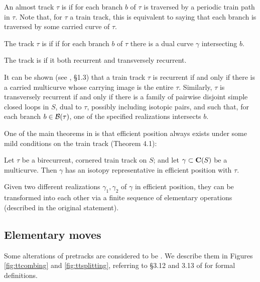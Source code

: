 \begin{defin}\label{def:recurrent}
An almost track $\tau$ is  if for each branch $b$ of $\tau$ is traversed by a periodic train path in $\tau$. Note that, for $\tau$ a train track, this is equivalent to saying that each branch is traversed by some carried curve of $\tau$.

The track $\tau$ is  if if for each branch $b$ of $\tau$ there is a dual curve $\gamma$ intersecting $b$.

The track is  if it both recurrent and transversely recurrent.
\end{defin}

It can be shown (see \cite{penner}, \S 1.3) that a train track $\tau$ is recurrent if and only if there is a carried multicurve whose carrying image is the entire $\tau$. Similarly, $\tau$ is transversely recurrent if and only if there is a family of pairwise disjoint simple closed loops in $S$, dual to $\tau$, possibly including isotopic pairs, and such that, for each branch $b\in\mathcal B(\tau)$, one of the specified realizations intersects $b$.

One of the main theorems in \cite{mms} is that efficient position always exists under some mild conditions on the train track (Theorem 4.1):
\begin{theo}\label{thm:efficientpositionexists}
Let $\tau$ be a birecurrent, cornered train track on $S$; and let $\gamma\subset \mathbf C(S)$ be a multicurve. Then $\gamma$ has an isotopy representative in efficient position with $\tau$.

Given two different realizations $\gamma_1,\gamma_2$ of $\gamma$ in efficient position, they can be transformed into each other via a finite sequence of elementary operations (described in the original statement).
\end{theo}

\subsection{Elementary moves}

Some alterations of pretracks are considered to be . We describe them in Figures \ref{fig:ttcombing} and \ref{fig:ttsplitting}, referring to \S 3.12 and 3.13 of \cite{mosher} for formal definitions.

